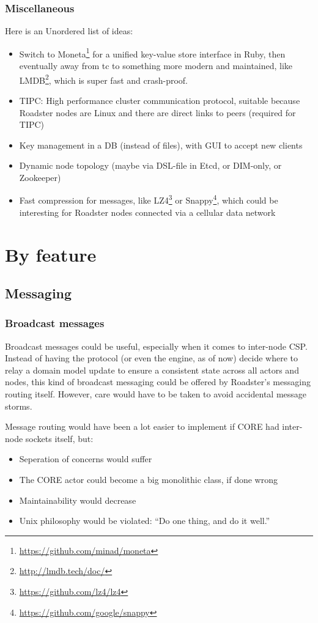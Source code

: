 \subsubsection{Miscellaneous}
Here is an Unordered list of ideas:
\begin{itemize}
	\item Switch to Moneta\footnote{\url{https://github.com/minad/moneta}} for a unified key-value store interface in Ruby, then eventually away from \gls{tc} to something more modern and maintained, like LMDB\footnote{\url{http://lmdb.tech/doc/}}, which is super fast and crash-proof.
	\item TIPC: High performance cluster communication protocol, suitable because Roadster nodes are Linux and there are direct links to peers (required for TIPC)
	\item Key management in a DB (instead of files), with GUI to accept new clients
	\item Dynamic node topology (maybe via DSL-file in Etcd, or DIM-only, or Zookeeper)
	\item Fast compression for messages, like LZ4\footnote{\url{https://github.com/lz4/lz4}} or Snappy\footnote{\url{https://github.com/google/snappy}}, which could be interesting for Roadster nodes connected via a cellular data network
\end{itemize}



\section{By feature}

\subsection{Messaging}
\subsubsection{Broadcast messages}
Broadcast messages could be useful, especially when it comes to inter-node CSP.
Instead of having the protocol (or even the engine, as of now) decide where to
relay a domain model update to ensure a consistent state across all actors and
nodes, this kind of broadcast messaging could be offered by Roadster's
messaging routing itself. However, care would have to be taken to avoid
accidental message storms.

Message routing would have been a lot easier to implement if CORE had inter-node sockets itself, but:
\begin{itemize}
	\item Seperation of concerns would suffer
	\item The CORE actor could become a big monolithic class, if done wrong
	\item Maintainability would decrease
	\item Unix philosophy would be violated: ``Do one thing, and do it well.''
\end{itemize}

